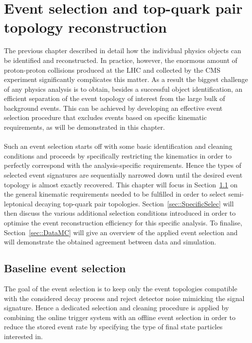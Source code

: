 \chapter{Event selection and top-quark pair topology reconstruction} \label{ch::EvtSel}

The previous chapter described in detail how the individual physics objects can be identified and reconstructed. In practice, however, the enormous amount of proton-proton collisions produced at the LHC and collected by the CMS experiment significantly complicates this matter.
As a result the biggest challenge of any physics analysis is to obtain, besides a successful object identification, an efficient separation of the event topology of interest from the large bulk of background events.
This can be achieved by developing an effective event selection procedure that excludes events based on specific kinematic requirements, as will be demonstrated in this chapter.
\\
\\
Such an event selection starts off with some basic identification and cleaning conditions and proceeds by specifically restricting the kinematics in order to perfectly correspond with the analysis-specific requirements. Hence the types of selected event signatures are sequentially narrowed down until the desired event topology is almost exactly recovered. This chapter will focus in Section~\ref{sec::MainSelec} on the general kinematic requirements needed to be fulfilled in order to select semi-leptonical decaying top-quark pair topologies. Section~\ref{sec::SpecificSelec} will then discuss the various additional selection conditions introduced in order to optimise the event reconstruction efficiency for this specific analysis.
To finalise, Section~\ref{sec::DataMC} will give an overview of the applied event selection and will demonstrate the obtained agreement between data and simulation.

\section{Baseline event selection}\label{sec::MainSelec}
The goal of the event selection is to keep only the event topologies compatible with the considered decay process and reject detector noise mimicking the signal signature. 
Hence a dedicated selection and cleaning procedure is applied by combining the online trigger system with an offline event selection in order to reduce the stored event rate by specifying the type of final state particles interested in.

